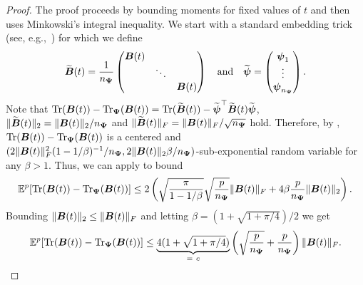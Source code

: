\color{black}
\begin{proof}
    The proof proceeds by bounding moments for fixed values of $t$ and then uses Minkowski's integral inequality. We start with a standard embedding trick (see, e.g.,~\cite[Theorem 1]{cortinovis-2022-randomized-trace}) for which we define
    \begin{equation}
        \widetilde{\boldsymbol{B}}(t)
        = \frac{1}{n_{\boldsymbol{\Psi}}} \begin{pmatrix}
            \boldsymbol{B}(t) & & \\
            & \ddots & \\
            & & \boldsymbol{B}(t)
        \end{pmatrix}
        \quad \text{and} \quad
        \widetilde{\boldsymbol{\psi}} = \begin{pmatrix}
            \boldsymbol{\psi}_1 \\
            \vdots \\
            \boldsymbol{\psi}_{n_{\boldsymbol{\Psi}}}
        \end{pmatrix}.
    \end{equation}
    Note that $\operatorname{Tr}(\boldsymbol{B}(t)) - \operatorname{Tr}_{\boldsymbol{\Psi}}(\boldsymbol{B}(t)) =  \operatorname{Tr}(\widetilde{\boldsymbol{B}}(t)) - \widetilde{\boldsymbol{\psi}}^{\top} \widetilde{\boldsymbol{B}}(t) \widetilde{\boldsymbol{\psi}}$, $\lVert \widetilde{\boldsymbol{B}}(t) \rVert _2 = \lVert \boldsymbol{B}(t) \rVert _2 / n_{\boldsymbol{\Psi}}$ and $\lVert \widetilde{\boldsymbol{B}}(t) \rVert _F = \lVert \boldsymbol{B}(t) \rVert _F / \sqrt{n_{\boldsymbol{\Psi}}}$ hold. Therefore, by , $\operatorname{Tr}(\boldsymbol{B}(t)) - \operatorname{Tr}_{\boldsymbol{\Psi}}(\boldsymbol{B}(t))$ is a centered and $(2 \lVert \boldsymbol{B}(t) \rVert _F^2 (1 - 1/\beta)^{-1} / n_{\boldsymbol{\Psi}}, 2 \lVert \boldsymbol{B}(t) \rVert _2 \beta / n_{\boldsymbol{\Psi}})$-sub-exponential random variable for any $\beta > 1$. Thus, we can apply  to bound
    \begin{equation}
        \mathbb{E}^{p}[\operatorname{Tr}(\boldsymbol{B}(t)) - \operatorname{Tr}_{\boldsymbol{\Psi}}(\boldsymbol{B}(t))] \leq 2 \left(\sqrt{\frac{\pi}{1-1/\beta}} \sqrt{\frac{p}{n_{\boldsymbol{\Psi}}}} \lVert \boldsymbol{B}(t) \rVert _F + 4 \beta \frac{p}{n_{\boldsymbol{\Psi}}} \lVert \boldsymbol{B}(t) \rVert _2 \right).
    \end{equation}
    Bounding $\lVert \boldsymbol{B}(t) \rVert _2 \leq \lVert \boldsymbol{B}(t) \rVert _F$ and letting $\beta = (1 + \sqrt{1 + \pi/4}) / 2$ we get
    \begin{equation}
        \mathbb{E}^{p}[\operatorname{Tr}(\boldsymbol{B}(t)) - \operatorname{Tr}_{\boldsymbol{\Psi}}(\boldsymbol{B}(t))] \leq \underbrace{4 (1 + \sqrt{1 + \pi/4})}_{=~c} \left( \sqrt{\frac{p}{n_{\boldsymbol{\Psi}}}} + \frac{p}{n_{\boldsymbol{\Psi}}} \right) \lVert \boldsymbol{B}(t) \rVert _F.
        \label{equ:moment-bound-hutchinson}
    \end{equation}


\end{proof}
